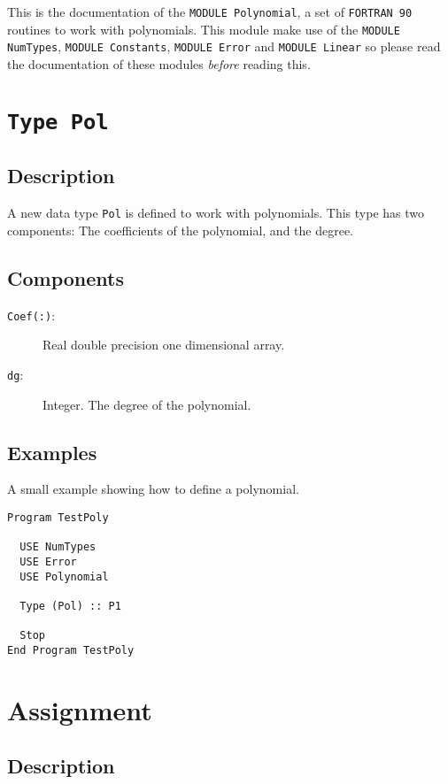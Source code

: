 This is the documentation of the \texttt{MODULE Polynomial}, a set
of \texttt{FORTRAN 90} routines to work with polynomials. This
module make use of the \texttt{MODULE NumTypes}, \texttt{MODULE
  Constants}, \texttt{MODULE Error} and \texttt{MODULE Linear} so
please read the documentation of these modules \emph{before} reading
this. 

\section{\texttt{Type Pol}}

\subsection{Description}

A new data type \texttt{Pol} is defined to work with polynomials. This
type has two components: The coefficients of the polynomial, and the
degree. 

\subsection{Components}

\begin{description}
\item[\texttt{Coef(:)}: ] Real double precision one dimensional
  array.
\item[\texttt{dg}:] Integer. The degree of the polynomial.
\end{description}

\subsection{Examples}

A small example showing how to define a polynomial.

\begin{verbatim}
Program TestPoly

  USE NumTypes
  USE Error
  USE Polynomial

  Type (Pol) :: P1

  Stop
End Program TestPoly
\end{verbatim}

\section{Assignment}

\subsection{Description}

